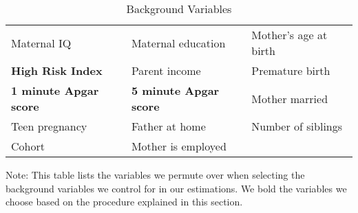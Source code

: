 \begin{table}[H]
\centering
\begin{threeparttable}
\caption{Background Variables}
\label{tab:pselectvars}
\begin{tabular}{C{5cm} C{5cm} C{5cm}}
\toprule
Maternal IQ			& Maternal education		& Mother's age at birth \\
\textbf{High Risk Index}		& Parent income			& Premature birth \\
\textbf{1 minute Apgar score}	& \textbf{5 minute Apgar score}	& Mother married \\
Teen pregnancy		& Father at home		& Number of siblings \\
Cohort 				& Mother is employed		& \\
\bottomrule
\end{tabular}
\begin{tablenotes}
\footnotesize
\item Note: This table lists the variables we permute over when selecting the background variables we control for in our estimations. We bold the variables we choose based on the procedure explained in this section.
\end{tablenotes}
\end{threeparttable}
\end{table}